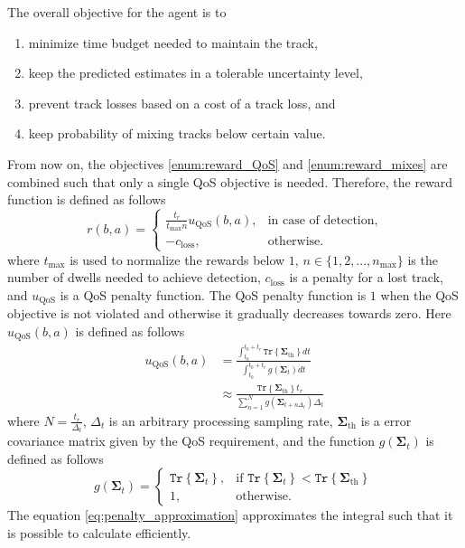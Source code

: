 \documentclass[english, 12pt, a4paper, elec, utf8, a-1b, online]{aaltothesis}
\newcommand{\tr}[1]{\texttt{Tr}\left\{ #1 \right\}}
\newcommand{\tmax}{t_\text{max}}
\newcommand{\nmax}{n_\text{max}}
\newcommand{\priorecovth}{\bm{\Sigma}_{\text{th}}}
\begin{document}
\newcommand{\uqos}{u_\text{QoS}}
\newcommand{\closs}{c_\text{loss}}
The overall objective for the agent is to 
\begin{enumerate}
    \item minimize time budget needed to maintain the track, \label{enum:reward_tbm}
    \item keep the predicted estimates in a tolerable uncertainty level, \label{enum:reward_QoS}
    \item prevent track losses based on a cost of a track loss, and \label{enum:reward_losses}
    \item keep probability of mixing tracks below certain value. \label{enum:reward_mixes}
\end{enumerate}
From now on, the objectives \ref{enum:reward_QoS} and \ref{enum:reward_mixes} are combined such that only a single QoS objective is needed.
Therefore, the reward function is defined as follows
\begin{equation} \label{eq:reward}
    r(b, a) =
    \left\{
    \begin{array}{ll}
        \frac{t_r}{\tmax n} \uqos(b, a), & \text{in case of detection,} \\
        -\closs, & \text{otherwise.}
    \end{array}\right. 
\end{equation}
where $\tmax$ is used to normalize the rewards below $1$, $n \in \{1, 2, ..., \nmax\}$ is the number of dwells needed to achieve detection, $\closs$ is a penalty for a lost track, and $\uqos$ is a QoS penalty function.
The QoS penalty function is $1$ when the QoS objective is not violated and otherwise it gradually decreases towards zero.
Here $\uqos(b, a)$ is defined as follows
\begin{align}
    \uqos(b, a)
    &= \frac{\int_{t_0}^{t_0+t_r} \tr{\priorecovth} dt}{\int_{t_0}^{t_0+t_r}  g(\bm{\Sigma}_t) dt} \\
    &\approx \frac{\tr{\priorecovth} t_r}{\sum_{n=1}^{N} g(\bm{\Sigma}_{t+n\Delta_t}) \Delta_t} \label{eq:penalty_approximation}
\end{align}
where $N=\frac{t_r}{\Delta_t}$, $\Delta_t$ is an arbitrary processing sampling rate, $\priorecovth$ is a error covariance matrix given by the QoS requirement, and the function $g(\bm{\Sigma}_t)$ is defined as follows
\begin{equation}
    g(\bm{\Sigma}_t) =
    \left\{
    \begin{array}{ll}
        \tr{\bm{\Sigma}_t}, & \text{if } \tr{\bm{\Sigma}_t} < \tr{\priorecovth} \\
        1, & \text{otherwise.}
    \end{array}
    \right.
\end{equation}
The equation \eqref{eq:penalty_approximation} approximates the integral such that it is possible to calculate efficiently.
\end{document}

